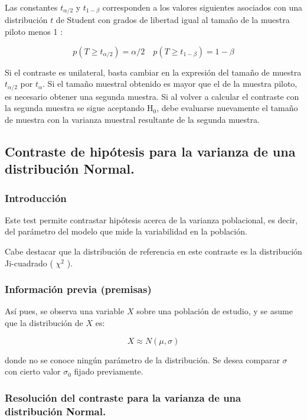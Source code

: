\documentclass[
]{article}
\begin{document}
Las constantes \(t_{\alpha / 2}\) y \(t_{1-\beta}\) corresponden a los valores siguientes asociados con una distribución \(t\) de Student con grados de libertad igual al tamaño de la muestra piloto menos 1 :

\[
p\left(T \geq t_{\alpha / 2}\right)=\alpha / 2 \quad p\left(T \geq t_{1-\beta}\right)=1-\beta
\]

Si el contraste es unilateral, basta cambiar en la expresión del tamaño de muestra \(t_{\alpha / 2}\) por \(t_{\alpha}\).
Si el tamaño muestral obtenido es mayor que el de la muestra piloto, es necesario obtener una segunda muestra. Si al volver a calcular el contraste con la segunda muestra se sigue aceptando \(\mathrm{H}_{0}\), debe evaluarse nuevamente el tamaño de muestra con la varianza muestral resultante de la segunda muestra.

\subsection{Contraste de hipótesis para la varianza de una distribución Normal.}\label{contraste-de-hipuxf3tesis-para-la-varianza-de-una-distribuciuxf3n-normal.}

\subsubsection{Introducción}\label{introducciuxf3n-5}

Este test permite contrastar hipótesis acerca de la varianza poblacional, es decir, del parámetro del modelo que mide la variabilidad en la población.

Cabe destacar que la distribución de referencia en este contraste es la distribución Ji-cuadrado ( \(\chi^{2}\) ).

\subsubsection{Información previa (premisas)}\label{informaciuxf3n-previa-premisas}

Así pues, se observa una variable \(X\) sobre una población de estudio, y se asume que la distribución de \(X\) es:

\[
X \approx N(\mu, \sigma)
\]

donde no se conoce ningún parámetro de la distribución. Se desea comparar \(\sigma\) con cierto valor \(\sigma_{0}\) fijado previamente.

\subsubsection{Resolución del contraste para la varianza de una distribución Normal.}\label{resoluciuxf3n-del-contraste-para-la-varianza-de-una-distribuciuxf3n-normal.}
\end{document}
